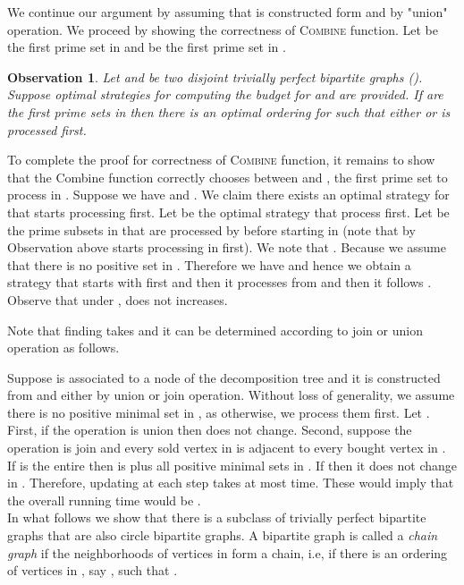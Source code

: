 \documentclass[letterpaper,11pt,abstracton]{scrartcl}
\newcommand{\qed}{\hfill}
\newtheorem{obs}[theorem]{Observation}
\begin{document}
We continue our argument by assuming that  is constructed form  and  by "union" operation.
We proceed by showing the correctness of \textsc{Combine} function. Let  be the first
prime set in  and  be the first prime set in . 



\begin{obs}
 Let  and  be two disjoint trivially perfect bipartite graphs (). Suppose optimal
strategies for computing the budget for  and  are provided.  If  are the first prime sets in  then there is an optimal
ordering for  such that either  or  is processed first. 
\end{obs}



To complete the proof for correctness of \textsc{Combine} function, it remains to show that the Combine function correctly chooses
between  and , the first prime set to process in . Suppose we have   and .
We claim there exists an optimal strategy for  that starts processing  first. Let  be the optimal strategy that process  first.
Let  be the prime subsets in  that are processed by  before starting  in  (note that by Observation above
 starts processing  in  first). We note that . Because we assume that there is no positive set
in . Therefore we have
 and hence we obtain a strategy  that starts
with  first and then it processes  from  and then it follows . Observe that under ,  does not increases.

Note that finding  takes  and it can be determined according to join or union operation as follows.  
 
Suppose  is associated to a
node of the decomposition tree and it is constructed from  and  either by union or join operation.
Without loss of generality, we assume there is no positive minimal set in , as otherwise, we process them first.
Let . First, if the operation is union then  does not change. Second, suppose the operation is join and every sold vertex in
 is adjacent to every bought vertex in . If  is the entire  then  is  plus all positive minimal sets in .
If  then it does not change in .
Therefore, updating  at each step takes at most  time. These would imply that the overall running time would be . 
\qed \\


In what follows we show that there is a subclass of trivially perfect bipartite graphs that are also circle bipartite graphs.
A bipartite graph  is called a \textit{chain graph} if the neighborhoods of vertices in  form a chain, i.e, if there is an ordering of vertices in , say , such that .
\end{document}
